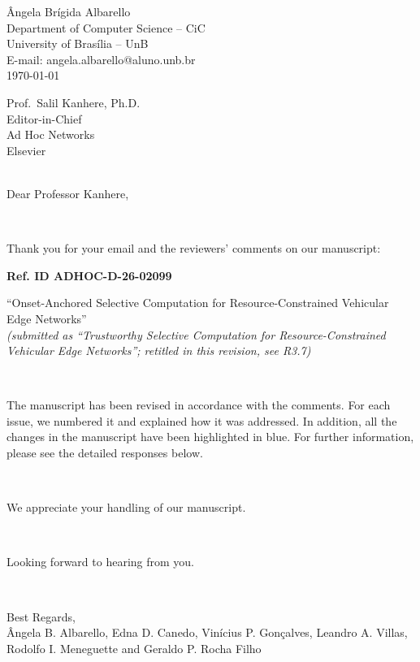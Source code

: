 \documentclass[1p,12pt,authoryear]{elsarticle}
\begin{document}
\begin{flushright}
\^Angela Br\'igida Albarello \\
Department of Computer Science -- CiC \\
University of Bras\'ilia -- UnB \\
E-mail: angela.albarello@aluno.unb.br \\
\today \\
\end{flushright}

\noindent Prof.\ Salil Kanhere, Ph.D. \\
\noindent Editor-in-Chief \\
\noindent Ad Hoc Networks \\
\noindent Elsevier \\

~

\noindent Dear Professor Kanhere,

~

\noindent Thank you for your email and the reviewers' comments on our manuscript:

\begin{center}
\textbf{Ref. ID ADHOC-D-26-02099}

``Onset-Anchored Selective Computation for Resource-Constrained Vehicular Edge Networks''\\[2pt]
{\normalsize\itshape (submitted as ``Trustworthy Selective Computation for Resource-Constrained Vehicular Edge Networks''; retitled in this revision, see R3.7)}
\end{center}

~

\noindent The manuscript has been revised in accordance with the comments. For each issue, we numbered it and explained how it was addressed. In addition, all the changes in the manuscript have been highlighted in blue. For further information, please see the detailed responses below.

~

\noindent We appreciate your handling of our manuscript.

~

\noindent Looking forward to hearing from you.

~

\noindent Best Regards,\\
\noindent \^Angela B. Albarello, Edna D. Canedo, Vin\'icius P. Gon\c{c}alves, Leandro A. Villas, Rodolfo I. Meneguette and Geraldo P. Rocha Filho

\newpage
\end{document}
